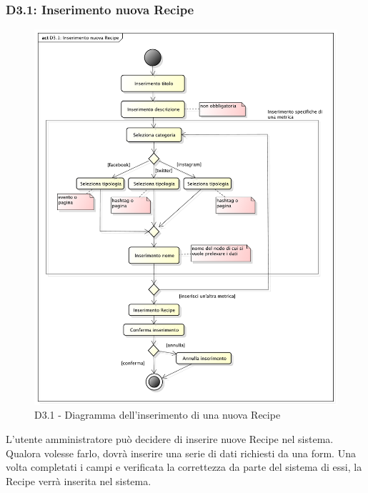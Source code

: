 		\subsubsection{D3.1: Inserimento nuova Recipe} %
		\label{ssub:inserimento_nuova_recipe}
		\begin{figure}[!htbp]
			\centering
			\centerline{\includegraphics[scale=0.45]{./images/D3_1.pdf}}
			\caption{D3.1 - Diagramma dell'inserimento di una nuova Recipe}
		\end{figure}
		\noindent
		L'utente amministratore può decidere di inserire nuove Recipe nel sistema. Qualora volesse farlo, dovrà inserire una serie di dati richiesti da una form. Una volta completati i campi e verificata la correttezza da parte del sistema di essi, la Recipe verrà inserita nel sistema.

		\pagebreak


